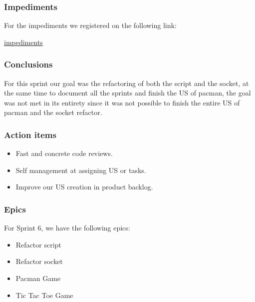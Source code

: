 \subsubsection{Impediments}
For the impediments we registered on the following link:

\href{https://docs.google.com/spreadsheets/d/16zbS6L_JsIA9JhoJ1_e8Luk3MzKs8KApNbeizERjYn0/edit?usp=sharing}{impediments}

\subsubsection{Conclusions}
For this sprint our goal was the refactoring of both the script and the socket, at the same time to document all the sprints and finish the US of pacman, the goal was not met in its entirety since it was not possible to finish the entire US of pacman and the socket refactor. 

\subsubsection{Action items}

\begin{itemize}
    \item Fast and concrete code reviews.
    \item Self management at assigning US or tasks.
    \item Improve our US creation in product backlog.
\end{itemize}


\subsubsection{Epics}

For Sprint 6, we have the following epics:

\begin{itemize}
    \item Refactor script
    \item Refactor socket
    \item Pacman Game
    \item Tic Tac Toe Game
\end{itemize}